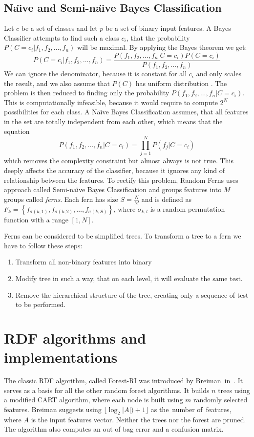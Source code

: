 \documentclass[thesis=B,english]{FITthesis}[2012/10/20]
\begin{document}
	\subsection{Na\"{\i}ve and Semi-na\"{\i}ve Bayes Classification}
	Let \(c\) be a set of classes and let \(p\) be a set of binary input features. A Bayes Classifier attempts to find such a class \(c_i\), that the probability \(P(C=c_i|f_1,f_2,\dots,f_n)\) will be maximal. By applying the Bayes theorem we get: 
	\[
	P(C=c_i|f_1,f_2,\dots,f_n)=\frac{P(f_1,f_2,\dots,f_n|C=c_i)P(C=c_i)}{P(f_1,f_2,\dots,f_n)}
	\] 
	We can ignore the denominator, because it is constant for all \(c_i\) and only scales the result, and we also assume that \(P(C)\) has uniform distribution \cite{ozuysal2010fast}. The problem is then reduced to finding only the probability \(P(f_1,f_2,\dots,f_n|C=c_i)\). This is computationally infeasible, because it would require to compute \(2^N\) possibilities for each class. A Na\"{\i}ve Bayes Classification assumes, that all features in the set are totally independent from each other, which means that the equation 
	\[
		P(f_1,f_2,\dots,f_n|C=c_i)=\prod_{j=1}^{N} P(f_j|C=c_i)
	\]
	which removes the complexity constraint but almost always is not true. This deeply affects the accuracy of the classifier, because it ignores any kind of relationship between the features. To rectify this problem, Random Ferns uses approach called Semi-na\"{\i}ve Bayes Classification and groups features into \(M\) groups called \emph{ferns}. Each fern has size \(S=\frac{N}{M}\) and is defined as \(F_k=\left\{f_{\sigma(k,1)},f_{\sigma(k,2)}, \dots,f_{\sigma(k,S)}\right\}\), where \(\sigma_{k, l}\) is a random permutation function with a range \([1,N]\).

	Ferns can be considered to be simplified trees. To transform a tree to a fern we have to follow these steps:
	\begin{enumerate}
	\item Transform all non-binary features into binary
	\item Modify tree in such a way, that on each level, it will evaluate the same test.
	\item Remove the hierarchical structure of the tree, creating only a sequence of test to be performed.
	\end{enumerate}



	\section{RDF algorithms and implementations}
	The classic RDF algorithm, called Forest-RI was introduced by Breiman~in~\cite{BR01}. It serves as a basis for all the other random forest algorithms. It builds \(n\) trees using a modified CART algorithm, where each node is built using \(m\) randomly selected features. Breiman suggests using \(\lfloor \log_2|A|)+1\rfloor\) as the~number of~features, where \(A\) is the input features vector. Neither the trees nor the forest are pruned. The algorithm also computes an out of bag error and a confusion matrix. 
\end{document}
